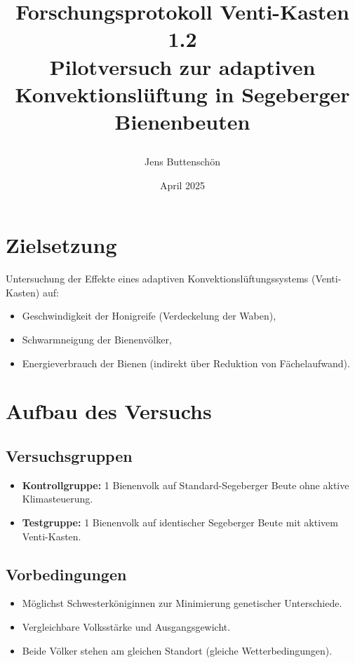 \documentclass[11pt,a4paper]{article}
\title{\parbox{\linewidth}{\centering\textbf{
Forschungsprotokoll Venti-Kasten 1.2\\
Pilotversuch zur adaptiven Konvektionsl\"uftung in Segeberger Bienenbeuten}}}
\author{Jens Buttensch\"on}
\date{April 2025}
\begin{document}
\maketitle

\section*{Zielsetzung}
Untersuchung der Effekte eines adaptiven Konvektionsl\"uftungssystems (Venti-Kasten) auf:
\begin{itemize}[topsep=2pt]
  \item Geschwindigkeit der Honigreife (Verdeckelung der Waben),
  \item Schwarmneigung der Bienenv\"olker,
  \item Energieverbrauch der Bienen (indirekt \"uber Reduktion von F\"achelaufwand).
\end{itemize}

\section*{Aufbau des Versuchs}
\subsection*{Versuchsgruppen}
\begin{itemize}[topsep=2pt]
  \item \textbf{Kontrollgruppe:} 1 Bienenvolk auf Standard-Segeberger Beute ohne aktive Klimasteuerung.
  \item \textbf{Testgruppe:} 1 Bienenvolk auf identischer Segeberger Beute mit aktivem Venti-Kasten.
\end{itemize}

\subsection*{Vorbedingungen}
\begin{itemize}[topsep=2pt]
  \item M\"oglichst Schwesterk\"oniginnen zur Minimierung genetischer Unterschiede.
  \item Vergleichbare Volksst\"arke und Ausgangsgewicht.
  \item Beide V\"olker stehen am gleichen Standort (gleiche Wetterbedingungen).
\end{itemize}
\end{document}
